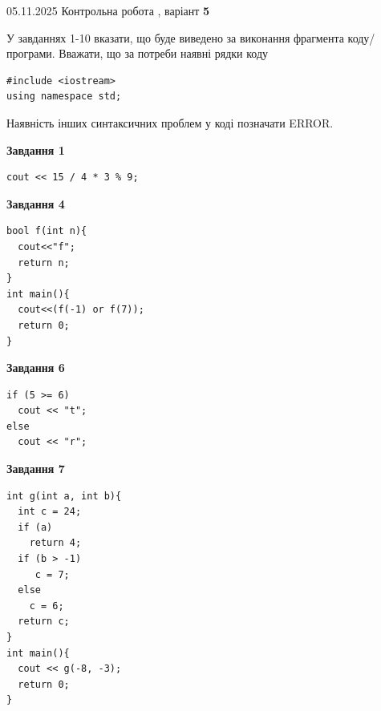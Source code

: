 \documentclass[12pt, ukrainian]{article}
\begin{document}
\newpage

{\Large{05.11.2025 Контрольна робота , варіант  \No \textbf { 5 }\par}}
{
\begin {large}
У завданнях 1-10 вказати, що буде виведено за виконання фрагмента коду/про\-гра\-ми.
Вважати, що за потреби наявні рядки коду
\begin{verbatim}
#include <iostream>
using namespace std;
\end{verbatim}
Наявність інших синтаксичних проблем у коді позначати ERROR.

\begin{minipage}[t]{7.0cm}

\begin{center}
\textbf{Завдання 1}
\end{center}
\vspace{-8mm}

\begin{verbatim}
cout << 15 / 4 * 3 % 9;
\end{verbatim}



\begin{center}
\textbf{Завдання 4}
\end{center}
\vspace{-8mm}

\begin{verbatim}
bool f(int n){
  cout<<"f";
  return n;
}
int main(){
  cout<<(f(-1) or f(7));
  return 0;
}
\end{verbatim}



\begin{center}
\textbf{Завдання 6}
\end{center}
\vspace{-8mm}

\begin{verbatim}
if (5 >= 6)
  cout << "t";
else
  cout << "r";
\end{verbatim}



\begin{center}
\textbf{Завдання 7}
\end{center}
\vspace{-8mm}

\begin{verbatim}
int g(int a, int b){
  int c = 24;
  if (a)
    return 4;
  if (b > -1)
     c = 7;
  else
    c = 6;
  return c;
}
int main(){
  cout << g(-8, -3);
  return 0;
}
\end{verbatim}


\end{minipage}
\end{large}}
\end{document}
